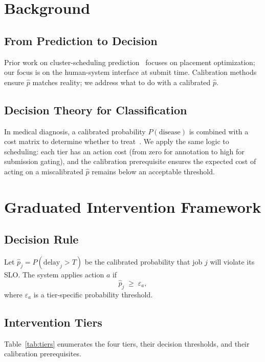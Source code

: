 \documentclass[sigconf]{acmart}
\begin{document}
\section{Background}
\subsection{From Prediction to Decision}
Prior work on cluster-scheduling prediction~\cite{decima} focuses on placement optimization; our focus is on the human-system interface at submit time. Calibration methods~\cite{guo2017calibration,platt1999} ensure $\hat{p}$ matches reality; we address what to do with a calibrated $\hat{p}$.

\subsection{Decision Theory for Classification}
In medical diagnosis, a calibrated probability $P(\text{disease})$ is combined with a cost matrix to determine whether to treat~\cite{elkan2001}. We apply the same logic to scheduling: each tier has an action cost (from zero for annotation to high for submission gating), and the calibration prerequisite ensures the expected cost of acting on a miscalibrated $\hat{p}$ remains below an acceptable threshold.

\section{Graduated Intervention Framework}
\label{sec:framework}

\subsection{Decision Rule}
Let $\hat{p}_j = P(\text{delay}_j > T)$ be the calibrated probability that job $j$ will violate its SLO. The system applies action $a$ if
\begin{equation}
\hat{p}_j \;\ge\; \varepsilon_a,
\label{eq:rule}
\end{equation}
where $\varepsilon_a$ is a tier-specific probability threshold.

\subsection{Intervention Tiers}
Table~\ref{tab:tiers} enumerates the four tiers, their decision thresholds, and their calibration prerequisites.
\end{document}
